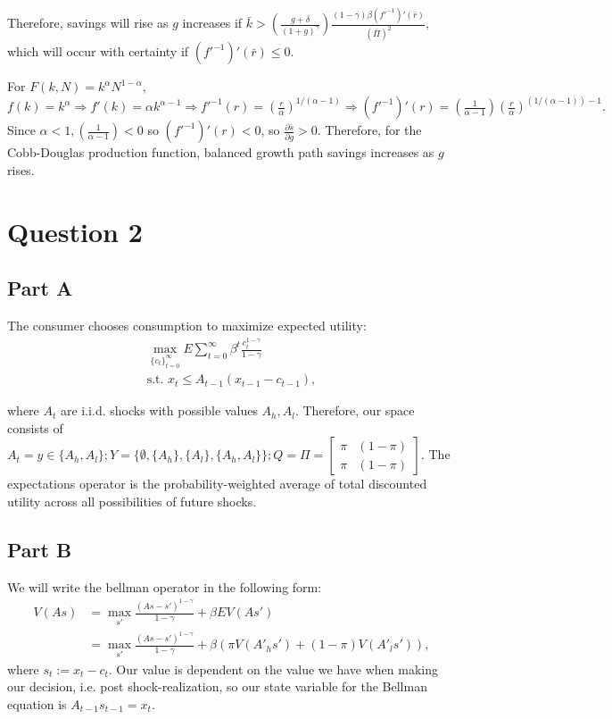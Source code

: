 \documentclass[11pt]{article} %
\begin{document}
Therefore, savings will rise as $g$ increases if $ \bar{k} > \left( \frac{g+\delta}{(1+g)^{\gamma}} \right) \frac{(1-\gamma)\beta (f'^{-1})'(\bar{r})}{(\bar{\Pi})^2},$ which will occur with certainty if $(f'^{-1})'(\bar{r})\leq0.$

For $F(k,N) = k^{\alpha} N^{1-\alpha},$ $f(k) = k^{\alpha} \Rightarrow f'(k) = \alpha k^{\alpha - 1} \Rightarrow f'^{-1}(r) = \left(\frac{r}{\alpha}\right)^{1/(\alpha-1)} \Rightarrow (f'^{-1})'(r) = \left( \frac{1}{\alpha - 1}\right) \left(\frac{r}{\alpha}\right)^{(1/(\alpha-1)) - 1}. $ Since $\alpha<1,  \left( \frac{1}{\alpha - 1}\right) <0$ so $(f'^{-1})'(r)<0$, so $\frac{\partial \bar{s}}{\partial g}>0$. Therefore, for the Cobb-Douglas production function, balanced growth path savings increases as $g$ rises.

\section{Question 2}
\subsection{Part A}
The consumer chooses consumption to maximize expected utility:
\begin{align*}
\max_{\{c_t\}_{t=0}^{\infty}} E\sum_{t=0}^{\infty}\beta^t \frac{c_t^{1-\gamma}}{1-\gamma}\\
\text{s.t. } x_t \leq A_{t-1}(x_{t-1} - c_{t-1}),
\end{align*}

where $A_t$ are i.i.d. shocks with possible values $A_h,A_l$. Therefore, our space consists of $A_t = y \in \{ A_h,A_l \}; Y = \{ \emptyset, \{A_h\},\{ A_l\}, \{ A_h,A_l\}\}; Q = \Pi = \begin{bmatrix} \pi & (1-\pi) \\ \pi & (1-\pi)\end{bmatrix}$. The expectations operator is the probability-weighted average of total discounted utility across all possibilities of future shocks. 
\subsection{Part B}
We will write the bellman operator in the following form:
\begin{align*}
V(As) &= \max_{s'} \frac{(As - s')^{1-\gamma}}{1-\gamma} + \beta EV(As')\\
&= \max_{s'} \frac{(As - s')^{1-\gamma}}{1-\gamma} + \beta (\pi V(A'_h s') + (1-\pi) V(A'_l s' )),
\end{align*}
where $s_t := x_t - c_t$. Our value is dependent on the value we have when making our decision, i.e. post shock-realization, so our state variable for the Bellman equation is $A_{t-1}s_{t-1} = x_t$.
\end{document}
